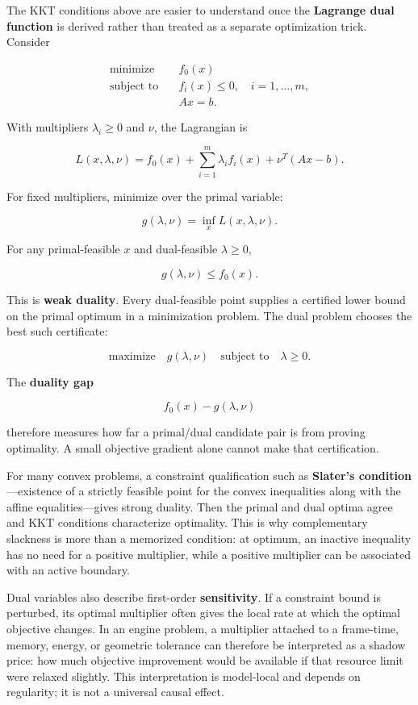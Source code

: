 \hypertarget{02-foundations-ii-ch026-the-dual-problem-is-a-lower-bound-certificate-a-geometry-and-a-sensitivity-model}{}

The KKT conditions above are easier to understand once the \textbf{Lagrange dual function} is derived rather than treated as a separate optimization trick. Consider

\[
\begin{aligned}
\text{minimize}\quad & f_0(x)\\
\text{subject to}\quad & f_i(x)\le 0,\quad i=1,\ldots,m,\\
& Ax=b.
\end{aligned}
\]

With multipliers \(\lambda_i\ge0\) and \(\nu\), the Lagrangian is

\[
L(x,\lambda,\nu)
=
f_0(x)
+
\sum_{i=1}^{m}\lambda_i f_i(x)
+
\nu^T(Ax-b).
\]

For fixed multipliers, minimize over the primal variable:

\[
g(\lambda,\nu)
=
\inf_x L(x,\lambda,\nu).
\]

For any primal-feasible \(x\) and dual-feasible \(\lambda\ge0\),

\[
g(\lambda,\nu)
\le
f_0(x).
\]

This is \textbf{weak duality}. Every dual-feasible point supplies a certified lower bound on the primal optimum in a minimization problem. The dual problem chooses the best such certificate:

\[
\text{maximize}\quad g(\lambda,\nu)
\quad
\text{subject to}\quad \lambda\ge0.
\]

The \textbf{duality gap}

\[
f_0(x)-g(\lambda,\nu)
\]

therefore measures how far a primal/dual candidate pair is from proving optimality. A small objective gradient alone cannot make that certification.

For many convex problems, a constraint qualification such as \textbf{Slater's condition}---existence of a strictly feasible point for the convex inequalities along with the affine equalities---gives strong duality. Then the primal and dual optima agree and KKT conditions characterize optimality. This is why complementary slackness is more than a memorized condition: at optimum, an inactive inequality has no need for a positive multiplier, while a positive multiplier can be associated with an active boundary.

Dual variables also describe first-order \textbf{sensitivity}. If a constraint bound is perturbed, its optimal multiplier often gives the local rate at which the optimal objective changes. In an engine problem, a multiplier attached to a frame-time, memory, energy, or geometric tolerance can therefore be interpreted as a shadow price: how much objective improvement would be available if that resource limit were relaxed slightly. This interpretation is model-local and depends on regularity; it is not a universal causal effect.

